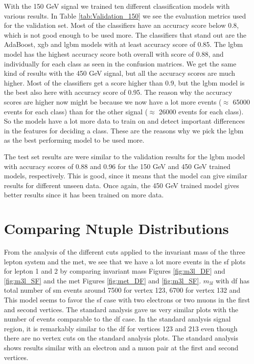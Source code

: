 \documentclass[a4paper, american, 12pt]{report}
\begin{document}
	With the 150 GeV signal we trained ten different classification models with various results. In Table \ref{tab:Validation_150} we see the evaluation metrics used for the validation set. Most of the classifiers have an accuracy score below 0.8, which is not good enough to be used more. The classifiers that stand out are the AdaBoost, \acrshort{xgb} and \acrshort{lgbm} models with at least accuracy score of 0.85. The \acrshort{lgbm} model has the highest accuracy score both overall with score of 0.88, and individually for each class as seen in the confusion matrices. We get the same kind of results with the 450 GeV signal, but all the accuracy scores are much higher. Most of the classifiers get a score higher than 0.9, but the \acrshort{lgbm} model is the best also here with accuracy score of 0.95. The reason why the accuracy scores are higher now might be because we now have a lot more events ($\approx$ 65000 events for each class) than for the other signal ($\approx$ 26000 events for each class). So the models have a lot more data to train on and detect important differences in the features for deciding a class. These are the reasons why we pick the \acrshort{lgbm} as the best performing model to be used more.

	The test set results are were similar to the validation results for the \acrshort{lgbm} model with accuracy scores of 0.88 and 0.96 for the 150 GeV and 450 GeV trained models, respectively. This is good, since it means that the model can give similar results for different unseen data. Once again, the 450 GeV trained model gives better results since it has been trained on more data.

	
	\section{Comparing Ntuple Distributions}
	\label{sect:Discussion-CompNtuples}
	From the analysis of the different cuts applied to the invariant mass of the three lepton system and the \acrshort{met}, we see that we have a lot more events in the \acrshort{sf} plots for lepton 1 and 2 by comparing invariant mass Figures \ref{fig:m3l_DF} and \ref{fig:m3l_SF} and the \acrshort{met} Figures \ref{fig:met_DF} and \ref{fig:m3l_SF}. $m_{3l}$ with \acrshort{df} has total number of \acrshort{sm} events around 7500 for vertex 123, 6700 for vertex 132 and 
	This model seems to favor the \acrshort{sf} case with two electrons or two muons in the first and second vertices. The standard analysis gave us very similar plots with the number of events comparable to the \acrshort{df} case. In the standard analysis signal region, it is remarkably similar to the \acrshort{df} for vertices 123 and 213 even though there are no vertex cuts on the standard analysis plots. The standard analysis shows results similar with an electron and a muon pair at the first and second vertices. 
	
\end{document}
